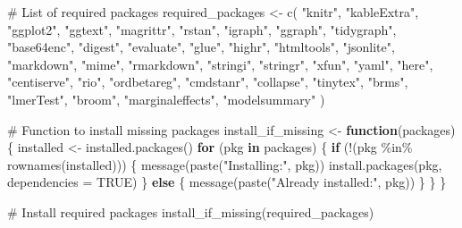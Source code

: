 \documentclass[
  12,
  letterpaper,
  DIV=11,
  numbers=noendperiod]{scrartcl}
\newenvironment{Shaded}{\begin{snugshade}}{\end{snugshade}}
\newcommand{\AttributeTok}[1]{\textcolor[rgb]{0.40,0.45,0.13}{#1}}
\newcommand{\CommentTok}[1]{\textcolor[rgb]{0.37,0.37,0.37}{#1}}
\newcommand{\ConstantTok}[1]{\textcolor[rgb]{0.56,0.35,0.01}{#1}}
\newcommand{\ControlFlowTok}[1]{\textcolor[rgb]{0.00,0.23,0.31}{\textbf{#1}}}
\newcommand{\FunctionTok}[1]{\textcolor[rgb]{0.28,0.35,0.67}{#1}}
\newcommand{\NormalTok}[1]{\textcolor[rgb]{0.00,0.23,0.31}{#1}}
\newcommand{\OtherTok}[1]{\textcolor[rgb]{0.00,0.23,0.31}{#1}}
\newcommand{\SpecialCharTok}[1]{\textcolor[rgb]{0.37,0.37,0.37}{#1}}
\newcommand{\StringTok}[1]{\textcolor[rgb]{0.13,0.47,0.30}{#1}}
\begin{document}
\begin{Shaded}
\begin{Highlighting}[numbers=left,,]
\CommentTok{\# List of required packages}
\NormalTok{required\_packages }\OtherTok{\textless{}{-}} \FunctionTok{c}\NormalTok{(}
  \StringTok{"knitr"}\NormalTok{, }\StringTok{"kableExtra"}\NormalTok{, }\StringTok{"ggplot2"}\NormalTok{, }\StringTok{"ggtext"}\NormalTok{, }\StringTok{"magrittr"}\NormalTok{, }\StringTok{"rstan"}\NormalTok{, }\StringTok{"igraph"}\NormalTok{, }\StringTok{"ggraph"}\NormalTok{, }\StringTok{"tidygraph"}\NormalTok{,}
  \StringTok{"base64enc"}\NormalTok{, }\StringTok{"digest"}\NormalTok{, }\StringTok{"evaluate"}\NormalTok{, }\StringTok{"glue"}\NormalTok{, }\StringTok{"highr"}\NormalTok{, }\StringTok{"htmltools"}\NormalTok{, }\StringTok{"jsonlite"}\NormalTok{, }\StringTok{"markdown"}\NormalTok{, }\StringTok{"mime"}\NormalTok{,}
  \StringTok{"rmarkdown"}\NormalTok{, }\StringTok{"stringi"}\NormalTok{, }\StringTok{"stringr"}\NormalTok{, }\StringTok{"xfun"}\NormalTok{, }\StringTok{"yaml"}\NormalTok{, }\StringTok{"here"}\NormalTok{, }\StringTok{"centiserve"}\NormalTok{, }\StringTok{"rio"}\NormalTok{, }\StringTok{"ordbetareg"}\NormalTok{,}
  \StringTok{"cmdstanr"}\NormalTok{, }\StringTok{"collapse"}\NormalTok{, }\StringTok{"tinytex"}\NormalTok{, }\StringTok{"brms"}\NormalTok{, }\StringTok{"lmerTest"}\NormalTok{, }\StringTok{"broom"}\NormalTok{, }\StringTok{"marginaleffects"}\NormalTok{, }\StringTok{"modelsummary"}
\NormalTok{)}

\CommentTok{\# Function to install missing packages}
\NormalTok{install\_if\_missing }\OtherTok{\textless{}{-}} \ControlFlowTok{function}\NormalTok{(packages) \{}
\NormalTok{  installed }\OtherTok{\textless{}{-}} \FunctionTok{installed.packages}\NormalTok{()}
  \ControlFlowTok{for}\NormalTok{ (pkg }\ControlFlowTok{in}\NormalTok{ packages) \{}
    \ControlFlowTok{if}\NormalTok{ (}\SpecialCharTok{!}\NormalTok{(pkg }\SpecialCharTok{\%in\%} \FunctionTok{rownames}\NormalTok{(installed))) \{}
      \FunctionTok{message}\NormalTok{(}\FunctionTok{paste}\NormalTok{(}\StringTok{"Installing:"}\NormalTok{, pkg))}
      \FunctionTok{install.packages}\NormalTok{(pkg, }\AttributeTok{dependencies =} \ConstantTok{TRUE}\NormalTok{)}
\NormalTok{    \} }\ControlFlowTok{else}\NormalTok{ \{}
      \FunctionTok{message}\NormalTok{(}\FunctionTok{paste}\NormalTok{(}\StringTok{"Already installed:"}\NormalTok{, pkg))}
\NormalTok{    \}}
\NormalTok{  \}}
\NormalTok{\}}

\CommentTok{\# Install required packages}
\FunctionTok{install\_if\_missing}\NormalTok{(required\_packages)}
\end{Highlighting}
\end{Shaded}
\end{document}
